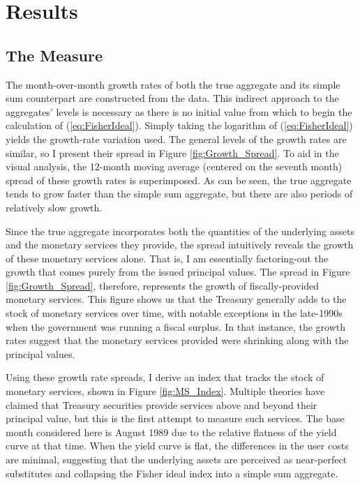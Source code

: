 \documentclass[11pt,a4paper,margin=1.5in]{article}
\begin{document}
\section{Results}
\label{sec:Results}

\subsection{The Measure}
\label{subsec:Results_Measure}

The month-over-month growth rates of both the true aggregate and its simple sum counterpart are constructed from the data.
This indirect approach to the aggregates' levels is necessary as there is no initial value from which to begin the calculation of (\ref{eq:FisherIdeal}).
Simply taking the logarithm of (\ref{eq:FisherIdeal}) yields the growth-rate variation used.
The general levels of the growth rates are similar, so I present their spread in Figure \ref{fig:Growth_Spread}.
To aid in the visual analysis, the 12-month moving average (centered on the seventh month) spread of these growth rates is superimposed.
As can be seen, the true aggregate tends to grow faster than the simple sum aggregate, but there are also periods of relatively slow growth.

Since the true aggregate incorporates both the quantities of the underlying assets and the monetary services they provide, the spread intuitively reveals the growth of these monetary services alone.
That is, I am essentially factoring-out the growth that comes purely from the issued principal values.
The spread in Figure \ref{fig:Growth_Spread}, therefore, represents the growth of fiscally-provided monetary services.
This figure shows us that the Treasury generally adds to the stock of monetary services over time, with notable exceptions in the late-1990s when the government was running a fiscal surplus.
In that instance, the growth rates suggest that the monetary services provided were shrinking along with the principal values. 


Using these growth rate spreads, I derive an index that tracks the stock of monetary services, shown in Figure \ref{fig:MS_Index}.
Multiple theories have claimed that Treasury securities provide services above and beyond their principal value, but this is the first attempt to measure such services. 
The base month considered here is August 1989 due to the relative flatness of the yield curve at that time.
When the yield curve is flat, the differences in the user costs are minimal, suggesting that the underlying assets are perceived as near-perfect substitutes and collapsing the Fisher ideal index into a simple sum aggregate.


\newpage



\end{document}
